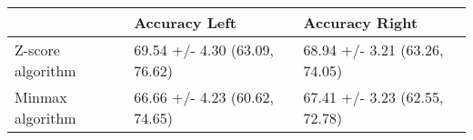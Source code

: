 \begin{tabular}{lll}
\toprule
{} &                  Accuracy Left &                 Accuracy Right \\
\midrule
Z-score algorithm &  69.54 +/- 4.30 (63.09, 76.62) &  68.94 +/- 3.21 (63.26, 74.05) \\
Minmax algorithm  &  66.66 +/- 4.23 (60.62, 74.65) &  67.41 +/- 3.23 (62.55, 72.78) \\
\bottomrule
\end{tabular}
